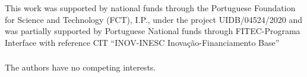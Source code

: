 \documentclass[runningheads]{llncs}
\begin{document}
\begin{credits}
\subsubsection{\ackname} This work was supported by national funds through the Portuguese Foundation for Science and Technology (FCT), I.P., under the project UIDB/04524/2020 and was partially supported by Portuguese National funds through FITEC-Programa Interface with reference CIT “INOV-INESC Inovação-Financiamento Base”

\subsubsection{\discintname}
The authors have no competing interests.
\end{credits}
%
%
%


%
\end{document}
